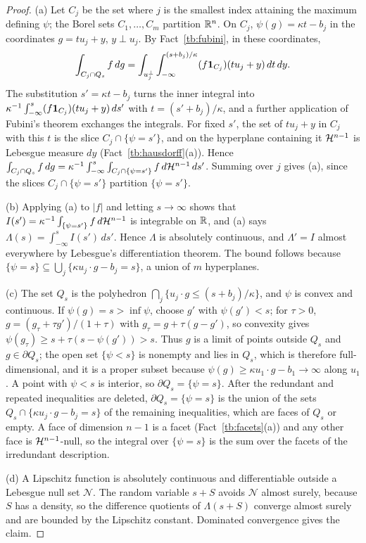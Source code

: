 \begin{proof}
(a) Let \(C_j\) be the set where \(j\) is the smallest index attaining the
maximum defining \(\psi\); the Borel sets \(C_1,\ldots,C_m\) partition
\(\mathbb R^n\). On \(C_j\), \(\psi(g)=\kappa t-b_j\) in the coordinates
\(g=tu_j+y\), \(y\perp u_j\). By Fact~\ref{tb:fubini}, in these coordinates,
\[
 \int_{C_j\cap Q_s}f\,dg=\int_{u_j^\perp}\int_{-\infty}^{(s+b_j)/\kappa}
 (f\mathbf 1_{C_j})(tu_j+y)\,dt\,dy .
\]
The substitution \(s'=\kappa t-b_j\) turns the inner integral into
\(\kappa^{-1}\int_{-\infty}^s(f\mathbf 1_{C_j})(tu_j+y)\,ds'\) with
\(t=(s'+b_j)/\kappa\), and a further application of Fubini's theorem
exchanges the integrals. For fixed \(s'\), the set of \(tu_j+y\) in \(C_j\)
with this \(t\) is the slice \(C_j\cap\{\psi=s'\}\), and on the hyperplane
containing it \(\mathcal H^{n-1}\) is Lebesgue measure \(dy\)
(Fact~\ref{tb:hausdorff}(a)). Hence
\(\int_{C_j\cap Q_s}f\,dg=\kappa^{-1}\int_{-\infty}^s\int_{C_j\cap\{\psi=s'\}}
f\,d\mathcal H^{n-1}\,ds'\). Summing over \(j\) gives (a), since the slices
\(C_j\cap\{\psi=s'\}\) partition \(\{\psi=s'\}\).

(b) Applying (a) to \(|f|\) and letting \(s\to\infty\) shows that
\(I(s')=\kappa^{-1}\int_{\{\psi=s'\}}f\,d\mathcal H^{n-1}\) is integrable on
\(\mathbb R\), and (a) says \(\Lambda(s)=\int_{-\infty}^sI(s')\,ds'\). Hence \(\Lambda\) is
absolutely continuous, and \(\Lambda'=I\) almost everywhere by Lebesgue's
differentiation theorem. The bound follows because
\(\{\psi=s\}\subseteq\bigcup_j\{\kappa u_j\cdot g-b_j=s\}\), a union of \(m\)
hyperplanes.

(c) The set \(Q_s\) is the polyhedron \(\bigcap_j\{u_j\cdot g\le(s+b_j)/\kappa\}\),
and \(\psi\) is convex and continuous. If \(\psi(g)=s>\inf\psi\), choose \(g'\)
with \(\psi(g')<s\); for \(\tau>0\), \(g=(g_\tau+\tau g')/(1+\tau)\) with
\(g_\tau=g+\tau(g-g')\), so convexity gives
\(\psi(g_\tau)\ge s+\tau(s-\psi(g'))>s\). Thus \(g\) is a limit of points
outside \(Q_s\) and \(g\in\partial Q_s\); the open set \(\{\psi<s\}\) is
nonempty and lies in \(Q_s\), which is therefore full-dimensional, and it
is a proper subset because \(\psi(g)\ge\kappa u_1\cdot g-b_1\to\infty\) along
\(u_1\). A point with \(\psi<s\) is interior, so \(\partial Q_s=\{\psi=s\}\). After
the redundant and repeated inequalities are deleted, \(\partial Q_s=\{\psi=s\}\)
is the union of the sets \(Q_s\cap\{\kappa u_j\cdot g-b_j=s\}\) of the
remaining inequalities, which are faces of \(Q_s\) or empty. A face of
dimension \(n-1\) is a facet (Fact~\ref{tb:facets}(a)) and any other face is
\(\mathcal H^{n-1}\)-null, so the integral over \(\{\psi=s\}\) is the sum over the
facets of the irredundant description.

(d) A Lipschitz function is absolutely continuous and differentiable outside a
Lebesgue null set \(\mathcal N\). The random variable \(s+S\) avoids
\(\mathcal N\) almost surely, because \(S\) has a density, so the difference
quotients of \(\Lambda(s+S)\) converge almost surely and are bounded by the
Lipschitz constant. Dominated convergence gives the claim.
\end{proof}

